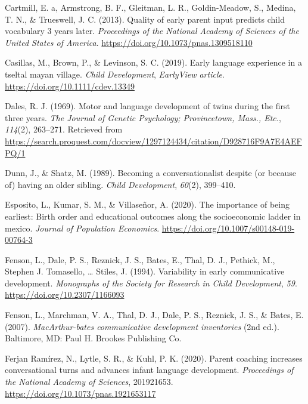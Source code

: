 \documentclass[man,floatsintext]{apa6}
\begin{document}
\leavevmode\hypertarget{ref-cartmill_quality_2013}{}%
Cartmill, E. a, Armstrong, B. F., Gleitman, L. R., Goldin-Meadow, S., Medina, T. N., \& Trueswell, J. C. (2013). Quality of early parent input predicts child vocabulary 3 years later. \emph{Proceedings of the National Academy of Sciences of the United States of America}. \url{https://doi.org/10.1073/pnas.1309518110}

\leavevmode\hypertarget{ref-casillas_early_2019}{}%
Casillas, M., Brown, P., \& Levinson, S. C. (2019). Early language experience in a tseltal mayan village. \emph{Child Development}, \emph{EarlyView article}. \url{https://doi.org/10.1111/cdev.13349}

\leavevmode\hypertarget{ref-dales_motor_1969}{}%
Dales, R. J. (1969). Motor and language development of twins during the first three years. \emph{The Journal of Genetic Psychology; Provincetown, Mass., Etc.}, \emph{114}(2), 263--271. Retrieved from \url{https://search.proquest.com/docview/1297124434/citation/D928716F9A7E4AEFPQ/1}

\leavevmode\hypertarget{ref-dunn_becoming_1989}{}%
Dunn, J., \& Shatz, M. (1989). Becoming a conversationalist despite (or because of) having an older sibling. \emph{Child Development}, \emph{60}(2), 399--410.

\leavevmode\hypertarget{ref-esposito_importance_2020}{}%
Esposito, L., Kumar, S. M., \& Villaseñor, A. (2020). The importance of being earliest: Birth order and educational outcomes along the socioeconomic ladder in mexico. \emph{Journal of Population Economics}. \url{https://doi.org/10.1007/s00148-019-00764-3}

\leavevmode\hypertarget{ref-fenson_variability_1994}{}%
Fenson, L., Dale, P. S., Reznick, J. S., Bates, E., Thal, D. J., Pethick, M., Stephen J. Tomasello, \ldots{} Stiles, J. (1994). Variability in early communicative development. \emph{Monographs of the Society for Research in Child Development}, \emph{59}. \url{https://doi.org/10.2307/1166093}

\leavevmode\hypertarget{ref-fenson_macarthur-bates_2007}{}%
Fenson, L., Marchman, V. A., Thal, D. J., Dale, P. S., Reznick, J. S., \& Bates, E. (2007). \emph{MacArthur-bates communicative development inventories} (2nd ed.). Baltimore, MD: Paul H. Brookes Publishing Co.

\leavevmode\hypertarget{ref-ferjan_ramirez_parent_2020}{}%
Ferjan Ramírez, N., Lytle, S. R., \& Kuhl, P. K. (2020). Parent coaching increases conversational turns and advances infant language development. \emph{Proceedings of the National Academy of Sciences}, 201921653. \url{https://doi.org/10.1073/pnas.1921653117}
\end{document}
